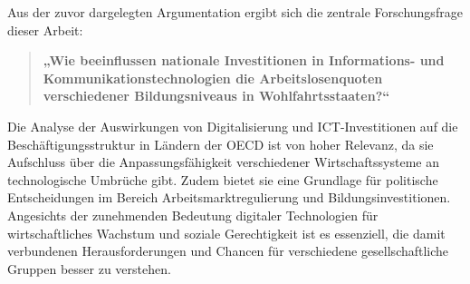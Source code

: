 Aus der zuvor dargelegten Argumentation ergibt sich die zentrale Forschungsfrage 
dieser Arbeit:

\begin{quote} 
    \textbf{„Wie beeinflussen nationale Investitionen in Informations- und 
    Kommunikationstechnologien die Arbeitslosenquoten verschiedener Bildungsniveaus 
    in Wohlfahrtsstaaten?“}
\end{quote}

Die Analyse der Auswirkungen von Digitalisierung und \ac{ICT}-Investitionen auf die 
Beschäftigungsstruktur in Ländern der \ac{OECD} ist von hoher Relevanz, da sie Aufschluss 
über die Anpassungsfähigkeit verschiedener Wirtschaftssysteme an technologische 
Umbrüche gibt. Zudem bietet sie eine Grundlage für politische Entscheidungen im 
Bereich Arbeitsmarktregulierung und Bildungsinvestitionen. Angesichts der zunehmenden 
Bedeutung digitaler Technologien für wirtschaftliches Wachstum und soziale 
Gerechtigkeit ist es essenziell, die damit verbundenen Herausforderungen und Chancen 
für verschiedene gesellschaftliche Gruppen besser zu verstehen.
